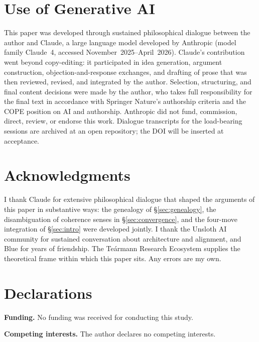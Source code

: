 \documentclass[11pt,a4paper,twocolumn]{article}
\begin{document}
\section*{Use of Generative AI}

This paper was developed through sustained philosophical dialogue
between the author and Claude, a large language model developed by
Anthropic (model family Claude~4, accessed November~2025--April~2026).
Claude's contribution went beyond copy-editing: it participated in
idea generation, argument construction, objection-and-response
exchanges, and drafting of prose that was then reviewed, revised, and
integrated by the author. Selection, structuring, and final content
decisions were made by the author, who takes full responsibility for
the final text in accordance with Springer Nature's authorship criteria
and the COPE position on AI and authorship. Anthropic did not fund,
commission, direct, review, or endorse this work. Dialogue transcripts
for the load-bearing sessions are archived at an open repository;
the DOI will be inserted at acceptance.


\section*{Acknowledgments}

I thank Claude for extensive philosophical dialogue that shaped the
arguments of this paper in substantive ways: the genealogy of
\S\ref{sec:genealogy}, the disambiguation of coherence senses in
\S\ref{sec:convergence}, and the four-move integration of
\S\ref{sec:intro} were developed jointly. I thank the Unsloth AI
community for sustained conversation about architecture and alignment,
and Blue for years of friendship. The Te\'armann Research Ecosystem
supplies the theoretical frame within which this paper sits. Any errors
are my own.


\section*{Declarations}

\noindent\textbf{Funding.} No funding was received for conducting this
study.

\noindent\textbf{Competing interests.} The author declares no competing
interests.
\end{document}
